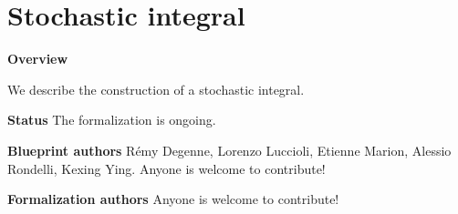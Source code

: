 \putbib

\part{Stochastic integral}

\textbf{Overview}

We describe the construction of a stochastic integral.

\textbf{Status} The formalization is ongoing.

\textbf{Blueprint authors} Rémy Degenne, Lorenzo Luccioli, Etienne Marion, Alessio Rondelli, Kexing Ying. Anyone is welcome to contribute!

\textbf{Formalization authors} Anyone is welcome to contribute!










\putbib
